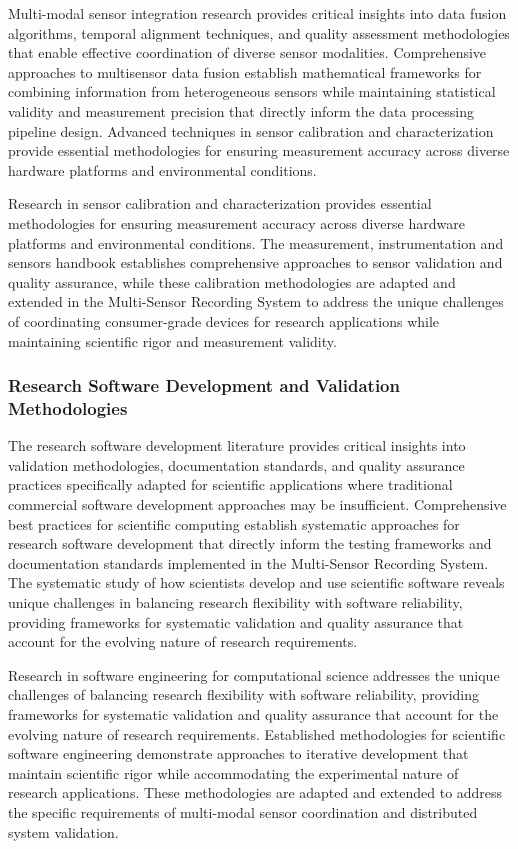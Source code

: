 \documentclass[12pt,a4paper]{article}
\begin{document}
Multi-modal sensor integration research provides critical insights into data fusion algorithms, temporal alignment
techniques, and quality assessment methodologies that enable effective coordination of diverse sensor modalities.
Comprehensive approaches to multisensor data fusion establish mathematical frameworks for combining information from
heterogeneous sensors while maintaining statistical validity and measurement precision that directly inform the data
processing pipeline design. Advanced techniques in sensor calibration and characterization provide essential
methodologies for ensuring measurement accuracy across diverse hardware platforms and environmental conditions.

Research in sensor calibration and characterization provides essential methodologies for ensuring measurement accuracy
across diverse hardware platforms and environmental conditions. The measurement, instrumentation and sensors handbook
establishes comprehensive approaches to sensor validation and quality assurance, while these calibration methodologies
are adapted and extended in the Multi-Sensor Recording System to address the unique challenges of coordinating
consumer-grade devices for research applications while maintaining scientific rigor and measurement validity.

\subsubsection{Research Software Development and Validation Methodologies}

The research software development literature provides critical insights into validation methodologies, documentation
standards, and quality assurance practices specifically adapted for scientific applications where traditional commercial
software development approaches may be insufficient. Comprehensive best practices for scientific computing establish
systematic approaches for research software development that directly inform the testing frameworks and documentation
standards implemented in the Multi-Sensor Recording System. The systematic study of how scientists develop and use
scientific software reveals unique challenges in balancing research flexibility with software reliability, providing
frameworks for systematic validation and quality assurance that account for the evolving nature of research
requirements.

Research in software engineering for computational science addresses the unique challenges of balancing research
flexibility with software reliability, providing frameworks for systematic validation and quality assurance that account
for the evolving nature of research requirements. Established methodologies for scientific software engineering
demonstrate approaches to iterative development that maintain scientific rigor while accommodating the experimental
nature of research applications. These methodologies are adapted and extended to address the specific requirements of
multi-modal sensor coordination and distributed system validation.
\end{document}
